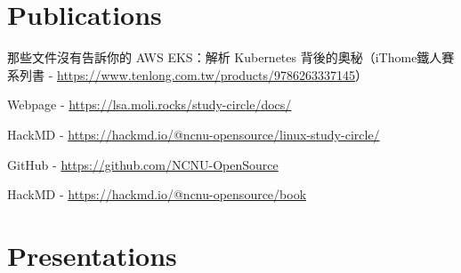 \documentclass[]{deedy-resume-openfont}
\begin{document}
\begin{minipage}[t]{1\textwidth}
\section{Publications}

\null\hfill{}
\begin{tightemize}
    \item 那些文件沒有告訴你的 AWS EKS：解析 Kubernetes 背後的奧秘（iThome鐵人賽系列書 - \href{https://www.tenlong.com.tw/products/9786263337145}{https://www.tenlong.com.tw/products/9786263337145}）
\end{tightemize}
\sectionsep

\null\hfill{}
\begin{tightemize}
    \item Webpage - \href{https://lsa.moli.rocks/study-circle/docs/}{https://lsa.moli.rocks/study-circle/docs/}
    \item HackMD - \href{https://hackmd.io/@ncnu-opensource/linux-study-circle/}{https://hackmd.io/@ncnu-opensource/linux-study-circle/}
\end{tightemize}
\sectionsep

\null\hfill{}
\begin{tightemize}
    \item GitHub - \href{https://github.com/NCNU-OpenSource}{https://github.com/NCNU-OpenSource}
    \item HackMD - \href{https://hackmd.io/@ncnu-opensource/book}{https://hackmd.io/@ncnu-opensource/book}
\end{tightemize}

\section{Presentations}


\null\hfill{}


\end{minipage}
\end{document}
